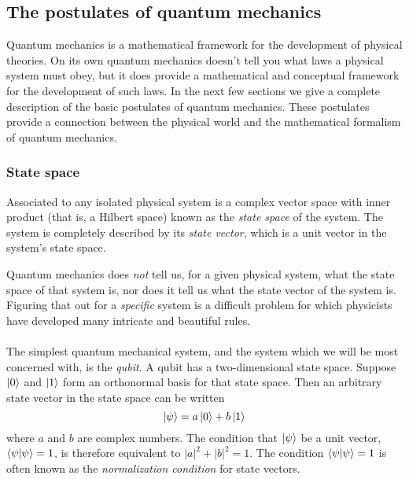 \subsection{The postulates of quantum mechanics}
Quantum mechanics is a mathematical framework for the development of physical theories. On its own quantum mechanics doesn’t tell you what laws a physical system must obey, but it does provide a mathematical and conceptual framework for the development of such laws. In the next few sections we give a complete description of the basic postulates of quantum mechanics. These postulates provide a connection between the physical world and the mathematical formalism of quantum mechanics.

\subsubsection{State space}
\begin{postulate}
    Associated to any isolated physical system is a complex vector space with inner product (that is, a Hilbert space) known as the \textit{state space} of the system. The system is completely described by its \textit{state vector}, which is a unit vector in the system’s state space.
\end{postulate}
Quantum mechanics does \textit{not} tell us, for a given physical system, what the state space of that system is, nor does it tell us what the state vector of the system is. Figuring that out for a \textit{specific} system is a difficult problem for which physicists have developed many intricate and beautiful rules.
\\\\
The simplest quantum mechanical system, and the system which we will be most concerned with, is the \textit{qubit}. A qubit has a two-dimensional state space. Suppose $\ket{0}$ and $\ket{1}$ form an orthonormal basis for that state space. Then an arbitrary state vector in the state space can be written
    $$\ket{\psi} = a\ket{0} + b\ket{1}$$
 where $a$ and $b$ are complex numbers. The condition that $\ket{\psi}$ be a unit vector, $\braket{\psi}{\psi} = 1$, is therefore equivalent to $|a|^2 + |b|^2 = 1$. The condition $\braket{\psi}{\psi} = 1$ is often known as the \textit{normalization condition} for state vectors.
 
